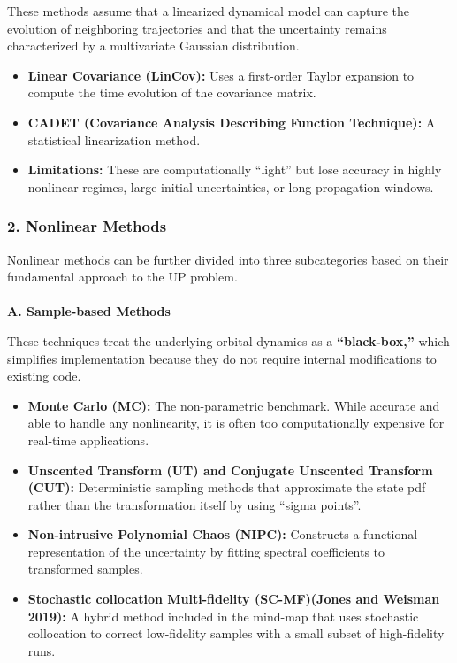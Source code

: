 \documentclass[
  letterpaper,
  DIV=11,
  numbers=noendperiod,
  oneside]{scrartcl}
\makeatletter
\let\oldparagraph\paragraph
\renewcommand{\paragraph}{
    \@ifstar
      \xxxParagraphStar
      \xxxParagraphNoStar
  }
\newcommand{\xxxParagraphStar}[1]{\oldparagraph*{#1}\mbox{}}
\newcommand{\xxxParagraphNoStar}[1]{\oldparagraph{#1}\mbox{}}
\makeatother
\begin{document}
These methods assume that a linearized dynamical model can capture the
evolution of neighboring trajectories and that the uncertainty remains
characterized by a multivariate Gaussian distribution.

\begin{itemize}
\item
  \textbf{Linear Covariance (LinCov):} Uses a first-order Taylor
  expansion to compute the time evolution of the covariance matrix.
\item
  \textbf{CADET (Covariance Analysis Describing Function Technique):} A
  statistical linearization method.
\item
  \textbf{Limitations:} These are computationally ``light'' but lose
  accuracy in highly nonlinear regimes, large initial uncertainties, or
  long propagation windows.
\end{itemize}

\subsubsection{2. Nonlinear Methods}\label{nonlinear-methods}

Nonlinear methods can be further divided into three subcategories based
on their fundamental approach to the UP problem.

\paragraph{\texorpdfstring{\textbf{A. Sample-based
Methods}}{A. Sample-based Methods}}\label{a.-sample-based-methods}

These techniques treat the underlying orbital dynamics as a
\textbf{``black-box,''} which simplifies implementation because they do
not require internal modifications to existing code.

\begin{itemize}
\item
  \textbf{Monte Carlo (MC):} The non-parametric benchmark. While
  accurate and able to handle any nonlinearity, it is often too
  computationally expensive for real-time applications.
\item
  \textbf{Unscented Transform (UT) and Conjugate Unscented Transform
  (CUT):} Deterministic sampling methods that approximate the state pdf
  rather than the transformation itself by using ``sigma points''.
\item
  \textbf{Non-intrusive Polynomial Chaos (NIPC):} Constructs a
  functional representation of the uncertainty by fitting spectral
  coefficients to transformed samples.
\item
  \textbf{Stochastic collocation Multi-fidelity (SC-MF)(Jones and
  Weisman 2019):} A hybrid method included in the mind-map that uses
  stochastic collocation to correct low-fidelity samples with a small
  subset of high-fidelity runs.
\end{itemize}
\end{document}
